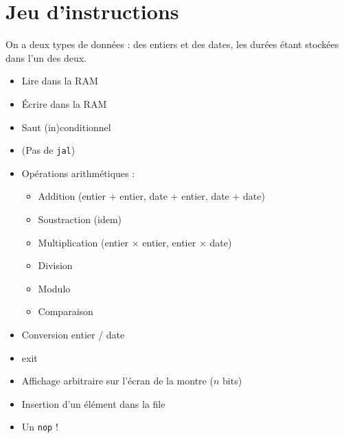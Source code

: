 \documentclass[a4paper]{article}
\begin{document}
\section{Jeu d'instructions}

On a deux types de données : des entiers et des dates, les durées étant
stockées dans l'un des deux.

\begin{itemize}
\item Lire dans la RAM
\item Écrire dans la RAM
\item Saut (in)conditionnel
\item (Pas de \texttt{jal})
\item Opérations arithmétiques :
\begin{itemize}
\item Addition (entier $+$ entier, date $+$ entier, date $+$ date)
\item Soustraction (idem)
\item Multiplication (entier $\times$  entier, entier $\times$ date)
\item Division
\item Modulo
\item Comparaison
\end{itemize}
\item Conversion entier / date
\item exit
\item Affichage arbitraire sur l'écran de la montre ($n$ bits)
\item Insertion d'un élément dans la file
\item Un \texttt{nop} !
\end{itemize}
\end{document}
